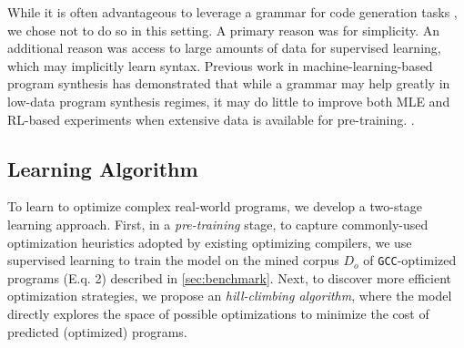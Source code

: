 \documentclass{article}
\begin{document}

While it is often advantageous to leverage a grammar for code generation tasks \citep{parisotto2016neuro,yin-neubig-2017-syntactic}, we chose not to do so in this setting. A primary reason was for simplicity. An additional reason was access to large amounts of data for supervised learning, which may implicitly learn syntax. Previous work in machine-learning-based program synthesis has demonstrated that while a grammar may help greatly in low-data program synthesis regimes, it may do little to improve both MLE and RL-based experiments when extensive data is available for pre-training. 
\cite{bunel2018leveraging}.

\subsection{Learning Algorithm}
\label{sec:hillclimbing}

To learn to optimize complex real-world programs, we develop a two-stage learning approach.
First, in a \emph{pre-training} stage, to capture commonly-used optimization heuristics adopted by existing optimizing compilers, we use supervised learning to train the model on the mined corpus $D_o$ of \texttt{GCC}-optimized programs (E.q. 2) described in \cref{sec:benchmark}. 
Next, to discover more efficient optimization strategies, we propose an  \emph{hill-climbing algorithm}, where the model directly explores the space of possible optimizations to minimize the cost of predicted (optimized) programs.
\end{document}
